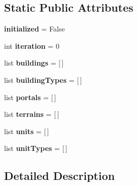 \subsection*{Static Public Attributes}
\begin{CompactItemize}
\item 
\hypertarget{classBaseAI_1_1BaseAI_32a836eb9aad27c111583f24238a686c}{
\textbf{initialized} = False}
\label{classBaseAI_1_1BaseAI_32a836eb9aad27c111583f24238a686c}

\item 
\hypertarget{classBaseAI_1_1BaseAI_54d7182ce68d3d2b55d247c431561f9d}{
int \textbf{iteration} = 0}
\label{classBaseAI_1_1BaseAI_54d7182ce68d3d2b55d247c431561f9d}

\item 
\hypertarget{classBaseAI_1_1BaseAI_e6e3fc5e4bda0d17a3ebe47365ef9e09}{
list \textbf{buildings} = \mbox{[}$\,$\mbox{]}}
\label{classBaseAI_1_1BaseAI_e6e3fc5e4bda0d17a3ebe47365ef9e09}

\item 
\hypertarget{classBaseAI_1_1BaseAI_14e8f0808f6288a31586468df99e1234}{
list \textbf{buildingTypes} = \mbox{[}$\,$\mbox{]}}
\label{classBaseAI_1_1BaseAI_14e8f0808f6288a31586468df99e1234}

\item 
\hypertarget{classBaseAI_1_1BaseAI_000a49539295be5f1fa7b7bc309989b5}{
list \textbf{portals} = \mbox{[}$\,$\mbox{]}}
\label{classBaseAI_1_1BaseAI_000a49539295be5f1fa7b7bc309989b5}

\item 
\hypertarget{classBaseAI_1_1BaseAI_945bab98670b912c7dd7cbfd498f4b69}{
list \textbf{terrains} = \mbox{[}$\,$\mbox{]}}
\label{classBaseAI_1_1BaseAI_945bab98670b912c7dd7cbfd498f4b69}

\item 
\hypertarget{classBaseAI_1_1BaseAI_4a3737dc78fb1ccb32781a1b04aa9ff6}{
list \textbf{units} = \mbox{[}$\,$\mbox{]}}
\label{classBaseAI_1_1BaseAI_4a3737dc78fb1ccb32781a1b04aa9ff6}

\item 
\hypertarget{classBaseAI_1_1BaseAI_405267241d7a9f7545b88b89a8d07ab8}{
list \textbf{unitTypes} = \mbox{[}$\,$\mbox{]}}
\label{classBaseAI_1_1BaseAI_405267241d7a9f7545b88b89a8d07ab8}

\end{CompactItemize}


\subsection{Detailed Description}


